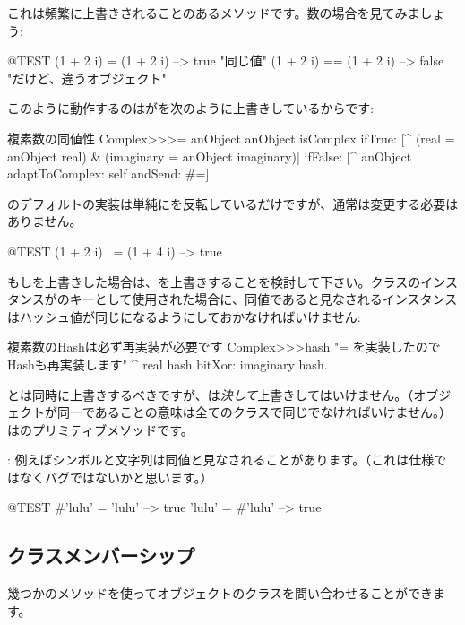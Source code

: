 \documentclass[a4paper,10pt,twoside]{book}
\begin{document}
これは頻繁に上書きされることのあるメソッドです。数の場合を見てみましょう:

\begin{code}{@TEST}
(1 + 2 i) = (1 + 2 i)   --> true     "同じ値"
(1 + 2 i) == (1 + 2 i) --> false    "だけど、違うオブジェクト"
\end{code}

このように動作するのはが\ct{=}を次のように上書きしているからです:
\begin{method}{複素数の同値性}
Complex>>>= anObject
    anObject isComplex
        ifTrue: [^ (real = anObject real) & (imaginary = anObject imaginary)]
        ifFalse: [^ anObject adaptToComplex: self andSend: #=]
\end{method}

のデフォルトの実装は単純にを反転しているだけですが、通常は変更する必要はありません。

\begin{code}{@TEST}
(1 + 2 i) ~= (1 + 4 i) --> true
\end{code}

もし\ct{=}を上書きした場合は、を上書きすることを検討して下さい。クラスのインスタンスがのキーとして使用された場合に、同値であると見なされるインスタンスはハッシュ値が同じになるようにしておかなければいけません:
\begin{method}{複素数のHashは必ず再実装が必要です}
Complex>>>hash
    "= を実装したのでHashも再実装します"
    ^ real hash bitXor: imaginary hash.
\end{method}

\ct{=}とは同時に上書きするべきですが、\ct{==}は\emph{決して}上書きしてはいけません。（オブジェクトが同一であることの意味は全てのクラスで同じでなければいけません。）\ct{==}はのプリミティブメソッドです。

: 例えばシンボルと文字列は同値と見なされることがあります。（これは仕様ではなくバグではないかと思います。）

\begin{code}{@TEST}
#'lulu' = 'lulu' --> true
'lulu' = #'lulu' --> true
\end{code}


\subsection{クラスメンバーシップ}
幾つかのメソッドを使ってオブジェクトのクラスを問い合わせることができます。
\end{document}
